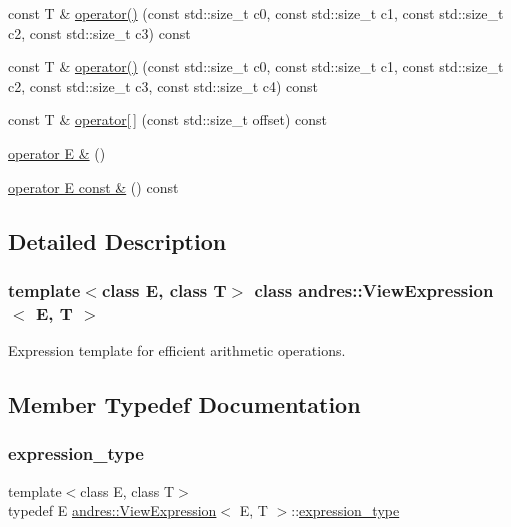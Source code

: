 \begin{DoxyCompactItemize}
const T \& \hyperlink{classandres_1_1ViewExpression_aefa796d758293ea9deee4307f7a3d3f0}{operator()} (const std\+::size\+\_\+t c0, const std\+::size\+\_\+t c1, const std\+::size\+\_\+t c2, const std\+::size\+\_\+t c3) const
\item 
const T \& \hyperlink{classandres_1_1ViewExpression_a0aaf6280a5c2b03bc2787a16cc8bd782}{operator()} (const std\+::size\+\_\+t c0, const std\+::size\+\_\+t c1, const std\+::size\+\_\+t c2, const std\+::size\+\_\+t c3, const std\+::size\+\_\+t c4) const
\item 
const T \& \hyperlink{classandres_1_1ViewExpression_aaee8008ec3c5e1c7e4d3cf689215b1fa}{operator\mbox{[}$\,$\mbox{]}} (const std\+::size\+\_\+t offset) const
\item 
\hyperlink{classandres_1_1ViewExpression_ac86ef8d95feb437c9b2707b6e7917f9e}{operator E \&} ()
\item 
\hyperlink{classandres_1_1ViewExpression_ad89af7848bb9e7c9ea2255e19d51aadb}{operator E const \&} () const
\end{DoxyCompactItemize}


\subsection{Detailed Description}
\subsubsection*{template$<$class E, class T$>$\newline
class andres\+::\+View\+Expression$<$ E, T $>$}

Expression template for efficient arithmetic operations. 

\subsection{Member Typedef Documentation}
\mbox{\label{classandres_1_1ViewExpression_a0b26c0956d2167c6c07ba2841066d450}} 
\subsubsection{\texorpdfstring{expression\+\_\+type}{expression\_type}}
{\footnotesize\ttfamily template$<$class E, class T$>$ \\
typedef E \hyperlink{classandres_1_1ViewExpression}{andres\+::\+View\+Expression}$<$ E, T $>$\+::\hyperlink{classandres_1_1ViewExpression_a0b26c0956d2167c6c07ba2841066d450}{expression\+\_\+type}}

